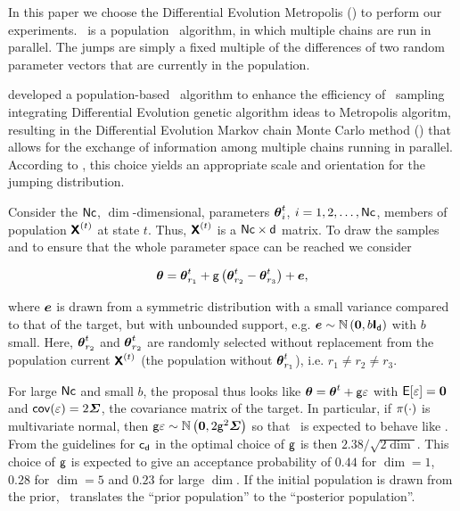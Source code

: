 In this paper we choose the Differential Evolution Metropolis (\DE) to perform our experiments.
\DE\ is a population \mcmc\ algorithm, in which multiple chains are run in parallel.
The jumps are simply a fixed multiple of the differences of two random parameter vectors that are currently in the population.

\cite{vrugt2003} developed a population-based \mcmc\ algorithm to enhance the efficiency of \mcmc\ sampling integrating Differential Evolution genetic algorithm ideas to Metropolis algoritm, resulting in the Differential Evolution Markov chain Monte Carlo method (\DE) that allows for the exchange of information among multiple chains running in parallel.
According to \cite{vrugt2003,braak2006}, this choice yields an appropriate scale and orientation for the jumping distribution.

Consider the $\mathsf{Nc}$, $\dim$-dimensional, parameters $\boldsymbol{{\theta}}^{{t}}_{i}$, $i=1,2,\dots,\mathsf{Nc}$, members of population $\boldsymbol{\mathsf{X}}^{(t)}$ at state $t$.
Thus, $\boldsymbol{\mathsf{X}}^{(t)}$ is a $\mathsf{Nc} \times \mathsf{d}$ matrix.
To draw the samples and to ensure that the whole parameter space can be reached we consider

\begin{equation}
 \boldsymbol{{\theta}} = \boldsymbol{{\theta}}^{{t}}_{r_1} + \mathsf{g}\left( \boldsymbol{{\theta}}^{{t}}_{r_2}-\boldsymbol{{\theta}}^{{t}}_{r_3} \right) + {\boldmath{\mbox{$e$}}},
 \label{proposalDE}
\end{equation}

\noindent where ${\boldmath{\mbox{$e$}}}$ is drawn from a symmetric distribution with a small variance compared to that of the target, but with
unbounded support, e.g. ${\boldmath{\mbox{$e$}}}\sim\mathbb{N}\left({\boldmath{\mbox{$0$}}},b\boldsymbol{\mathsf{I}}_{\mathsf{d}}\right)$ with $b$ small.
Here, $\boldsymbol{{\theta}}^{{t}}_{r_2}$ and $\boldsymbol{{\theta}}^{{t}}_{r_2}$ are randomly selected without replacement from the population current $\boldsymbol{\mathsf{X}}^{(t)}$ (the population without $\boldsymbol{{\theta}}^{{t}}_{r_1}$), i.e. $r_{1} \neq r_{2} \neq r_{3}$.

For large $\mathsf{Nc}$ and small $b$, the proposal  thus looks like $\boldsymbol{{\theta}} = \boldsymbol{{\theta}}^{{t}} + \mathsf{g} \varepsilon$ with
$\mathsf{E}\!\left[\varepsilon\right]={\boldmath{\mbox{$0$}}}$ and $\mathsf{cov}\!\left(\varepsilon\right) = 2\boldsymbol{\varSigma}$, the covariance matrix of the target.
In particular, if $\pi(\cdot)$ is multivariate normal, then $\mathsf{g}\varepsilon\sim\mathbb{N}\left({\boldmath{\mbox{$0$}}},2\mathsf{g}^2\boldsymbol{\varSigma}\right)$ so that \DE\
is expected to behave like \RW. From the guidelines for $\mathsf{c}_{\mathsf{d}}$ in \citep{roberts2001} the optimal choice of $\mathsf{g}$ is then $2.38 / \sqrt{2\dim}$.
This choice of $\mathsf{g}$ is expected to give an acceptance probability of $0.44$ for $\dim = 1$, $0.28$ for $\dim = 5$ and $0.23$ for large $\dim$.
If the initial population is drawn from the prior, \DE\ translates the ``prior population'' to the ``posterior population''.

